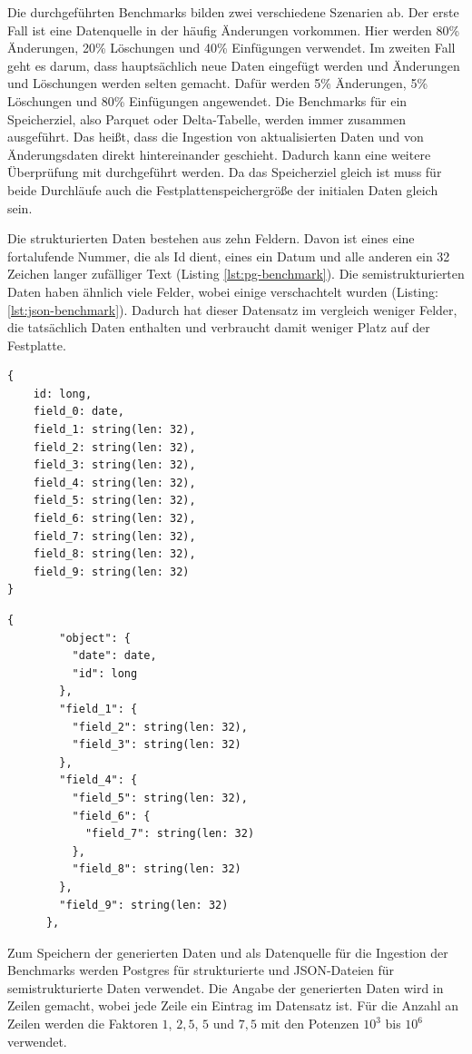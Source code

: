 Die durchgeführten Benchmarks bilden zwei verschiedene Szenarien ab.
Der erste Fall ist eine Datenquelle in der häufig Änderungen vorkommen.
Hier werden 80\% Änderungen, 20\% Löschungen und 40\% Einfügungen verwendet.
Im zweiten Fall geht es darum, dass hauptsächlich neue Daten eingefügt werden und Änderungen und Löschungen werden selten gemacht.
Dafür werden 5\% Änderungen, 5\% Löschungen und 80\% Einfügungen angewendet.
Die Benchmarks für ein Speicherziel, also Parquet oder Delta-Tabelle, werden immer zusammen ausgeführt.
Das heißt, dass die Ingestion von aktualisierten Daten und von Änderungsdaten direkt hintereinander geschieht.
Dadurch kann eine weitere Überprüfung mit durchgeführt werden.
Da das Speicherziel gleich ist muss für beide Durchläufe auch die Festplattenspeichergröße der initialen Daten gleich sein.

Die strukturierten Daten bestehen aus zehn Feldern.
Davon ist eines eine fortalufende Nummer, die als Id dient, eines ein Datum und alle anderen ein 32 Zeichen langer zufälliger Text (Listing \ref{lst:pg-benchmark}).
Die semistrukturierten Daten haben ähnlich viele Felder, wobei einige verschachtelt wurden (Listing: \cref{lst:json-benchmark}).
Dadurch hat dieser Datensatz im vergleich weniger Felder, die tatsächlich Daten enthalten und verbraucht damit weniger Platz auf der Festplatte.

\begin{lstlisting}[caption=Strukturierte Benchmark-Daten,label={lst:pg-benchmark}]
{
    id: long,
    field_0: date,
    field_1: string(len: 32),
    field_2: string(len: 32),
    field_3: string(len: 32),
    field_4: string(len: 32),
    field_5: string(len: 32),
    field_6: string(len: 32),
    field_7: string(len: 32),
    field_8: string(len: 32),
    field_9: string(len: 32)
}
\end{lstlisting}

\begin{lstlisting}[caption=Semistrukturierte Benchmark-Daten, label={lst:json-benchmark}]
    {
        "object": {
          "date": date,
          "id": long
        },
        "field_1": {
          "field_2": string(len: 32),
          "field_3": string(len: 32)
        },
        "field_4": {
          "field_5": string(len: 32),
          "field_6": {
            "field_7": string(len: 32)
          },
          "field_8": string(len: 32)
        },
        "field_9": string(len: 32)
      },
\end{lstlisting}

Zum Speichern der generierten Daten und als Datenquelle für die Ingestion der Benchmarks werden Postgres für strukturierte und JSON-Dateien für semistrukturierte Daten verwendet.
Die Angabe der generierten Daten wird in Zeilen gemacht, wobei jede Zeile ein Eintrag im Datensatz ist.
Für die Anzahl an Zeilen werden die Faktoren $1$, $2,5$, $5$ und $7,5$ mit den Potenzen $10^3$ bis $10^6$ verwendet.


